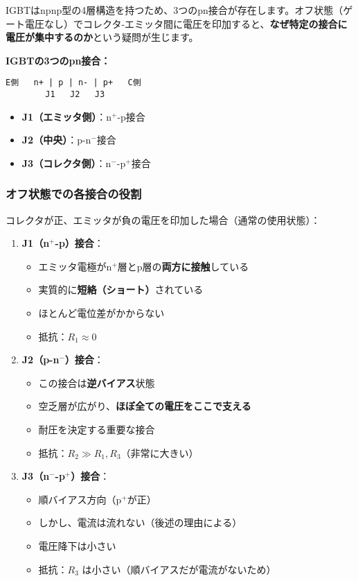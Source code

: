 IGBTはnpnp型の4層構造を持つため、3つのpn接合が存在します。オフ状態（ゲート電圧なし）でコレクタ-エミッタ間に電圧を印加すると、\textbf{なぜ特定の接合に電圧が集中するのか}という疑問が生じます。

\textbf{IGBTの3つのpn接合：}

\begin{verbatim}
E側   n+ | p | n- | p+   C側
        J1   J2   J3
\end{verbatim}

\begin{itemize}
\item \textbf{J1（エミッタ側）}：n$^+$-p接合
\item \textbf{J2（中央）}：p-n$^-$接合
\item \textbf{J3（コレクタ側）}：n$^-$-p$^+$接合
\end{itemize}

\subsubsection{オフ状態での各接合の役割}

コレクタが正、エミッタが負の電圧を印加した場合（通常の使用状態）：

\begin{enumerate}
\item \textbf{J1（n$^+$-p）接合}：
\begin{itemize}
\item エミッタ電極がn$^+$層とp層の\textbf{両方に接触}している
\item 実質的に\textbf{短絡（ショート）}されている
\item ほとんど電位差がかからない
\item 抵抗：$R_1 \approx 0$
\end{itemize}

\item \textbf{J2（p-n$^-$）接合}：
\begin{itemize}
\item この接合は\textbf{逆バイアス}状態
\item 空乏層が広がり、\textbf{ほぼ全ての電圧をここで支える}
\item 耐圧を決定する重要な接合
\item 抵抗：$R_2 \gg R_1, R_3$（非常に大きい）
\end{itemize}

\item \textbf{J3（n$^-$-p$^+$）接合}：
\begin{itemize}
\item 順バイアス方向（p$^+$が正）
\item しかし、電流は流れない（後述の理由による）
\item 電圧降下は小さい
\item 抵抗：$R_3$ は小さい（順バイアスだが電流がないため）
\end{itemize}
\end{enumerate}

